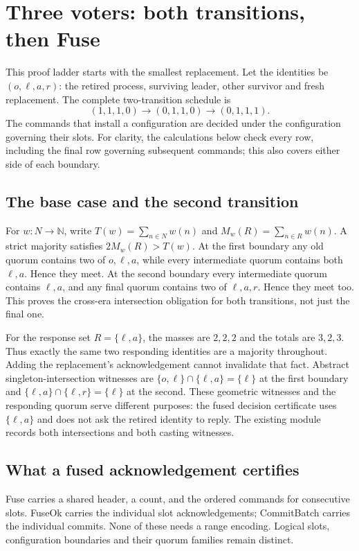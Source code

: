 \section{Three voters: both transitions, then Fuse}\label{sec:fuse}
This proof ladder starts with the smallest replacement. Let the identities be
$(o,\ell,a,r)$: the retired process, surviving leader, other survivor and fresh
replacement. The complete two-transition schedule is
\[
 (1,1,1,0)\longrightarrow(0,1,1,0)\longrightarrow(0,1,1,1).
\]
The commands that install a configuration are decided under the configuration
governing their slots. For clarity, the calculations below check every row,
including the final row governing subsequent commands; this also covers either
side of each boundary.

\subsection{The base case and the second transition}
For $w:N\to\mathbb N$, write $T(w)=\sum_{n\in N}w(n)$ and
$M_w(R)=\sum_{n\in R}w(n)$. A strict majority satisfies $2M_w(R)>T(w)$.
At the first boundary any old quorum contains two of $o,\ell,a$, while every
intermediate quorum contains both $\ell,a$. Hence they meet. At the second
boundary every intermediate quorum contains $\ell,a$, and any final quorum
contains two of $\ell,a,r$. Hence they meet too. This proves the cross-era
intersection obligation for both transitions, not just the final one.

For the response set $R=\{\ell,a\}$, the masses are $2,2,2$ and the totals
are $3,2,3$. Thus exactly the same two responding identities are a majority
throughout. Adding the replacement's acknowledgement cannot invalidate that
fact. Abstract singleton-intersection witnesses are
$\{o,\ell\}\cap\{\ell,a\}=\{\ell\}$ at the first boundary and
$\{\ell,a\}\cap\{\ell,r\}=\{\ell\}$ at the second.
These geometric witnesses and the responding quorum serve different purposes:
the fused decision certificate uses $\{\ell,a\}$ and does not ask the retired
identity to reply. The existing module  records
both intersections and both casting witnesses.

\subsection{What a fused acknowledgement certifies}
Fuse carries a shared header, a count, and the ordered commands for consecutive
slots. FuseOk carries the individual slot acknowledgements; CommitBatch carries
the individual commits. None of these needs a range encoding. Logical slots,
configuration boundaries and their quorum families remain distinct.

